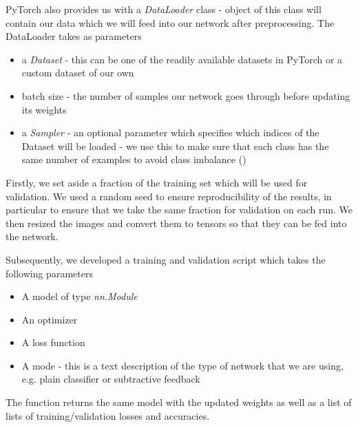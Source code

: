 \documentclass{l4proj}
\begin{document}
PyTorch also provides us with a \textit{DataLoader} class - object of this class will contain our data which we will feed into our network after preprocessing. The DataLoader takes as parameters
\begin{itemize}
    \item a \textit{Dataset} - this can be one of the readily available datasets in PyTorch or a custom dataset of our own
    \item batch size - the number of samples our network goes through before updating its weights
    \item a \textit{Sampler} - an optional parameter which specifies which indices of the Dataset will be loaded - we use this to make sure that each class has the same number of examples to avoid class imbalance (\cite{classimb})
\end{itemize}


Firstly, we set aside a fraction of the training set which will be used for validation. We used a random seed to ensure reproducibility of the results, in particular to ensure that we take the same fraction for validation on each run. We then resized the images and convert them to tensors so that they can be fed into the network.

Subsequently, we developed a training and validation script which takes the following parameters
\begin{itemize}
    \item A model of type \textit{nn.Module}
    \item An optimizer
    \item A loss function
    \item A mode - this is a text description of the type of network that we are using, e.g. plain classifier or subtractive feedback
\end{itemize}
The function returns the same model with the updated weights as well as a list of lists of training/validation losses and accuracies.
\end{document}

